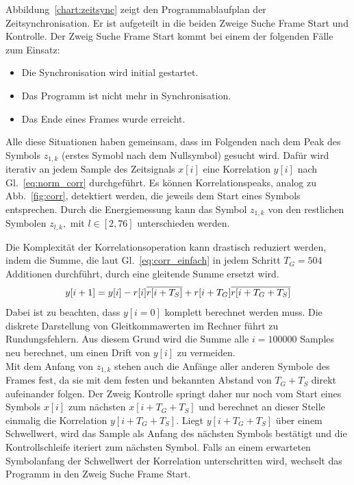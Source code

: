 Abbildung~\ref{chart:zeitsync} zeigt den Programmablaufplan der Zeitsynchronisation. Er ist aufgeteilt in die beiden Zweige \glqq Suche Frame Start\grqq{} und \glqq Kontrolle\grqq{}. Der Zweig \glqq Suche Frame Start\grqq{} kommt bei einem der folgenden Fälle zum Einsatz:
\begin{itemize}
\item Die Synchronisation wird initial gestartet.
\item Das Programm ist nicht mehr in Synchronisation.
\item Das Ende eines Frames wurde erreicht.
\end{itemize}
Alle diese Situationen haben gemeinsam, dass im Folgenden nach dem Peak des Symbols $z_{1,k}$ (erstes Symobl nach dem Nullsymbol) gesucht wird. Dafür wird iterativ an jedem Sample des Zeitsignals $x[i]$ eine Korrelation $y[i]$ nach Gl.~\ref{eq:norm_corr} durchgeführt. Es können Korrelationspeaks, analog zu Abb.~\ref{fig:corr},  detektiert werden, die jeweils dem Start eines Symbols entsprechen. Durch die Energiemessung kann das Symbol $z_{1,k}$ von den restlichen Symbolen $z_{l,k},$ mit  $l \in [2,76]$ unterschieden werden.

Die Komplexität der Korrelationsoperation kann drastisch reduziert werden, indem die Summe, die laut Gl.~\ref{eq:corr_einfach} in jedem Schritt $T_G = 504$ Additionen durchführt, durch eine gleitende Summe ersetzt wird.
\begin{equation}
    y[i+1] = y[i] - r[i] \overline{r[i+T_S]} + r[i+T_G] \overline{r[i+T_G+T_S]}
    \label{eq:moving_sum}
\end{equation}
Dabei ist zu beachten, dass $y[i=0]$ komplett berechnet werden muss. Die diskrete Darstellung von Gleitkommawerten im Rechner führt zu Rundungsfehlern. Aus diesem Grund wird die Summe alle $i=100000$ Samples neu berechnet, um einen Drift von $y[i]$ zu vermeiden.\\

Mit dem Anfang von $z_{1,k}$ stehen auch die Anfänge aller anderen Symbole des Frames fest, da sie mit dem festen und bekannten Abstand von $T_G+T_S$ direkt aufeinander folgen. Der Zweig \glqq Kontrolle\grqq{} springt daher nur noch vom Start eines Symbols $x[i]$ zum nächsten $x[i+T_G+T_S]$ und berechnet an dieser Stelle einmalig die Korrelation $y[i+T_G+T_S]$. Liegt $y[i+T_G+T_S]$ über einem Schwellwert, wird das Sample als Anfang des nächsten Symbols bestätigt und die Kontrollschleife iteriert zum nächsten Symbol. Falls an einem erwarteten Symbolanfang der Schwellwert der Korrelation unterschritten wird, wechselt das Programm in den Zweig \glqq Suche Frame Start\grqq{}.\\

